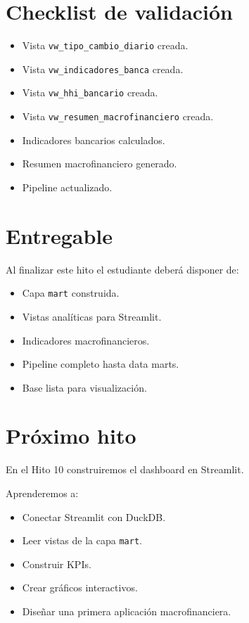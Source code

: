\section{Checklist de validación}

\begin{itemize}
\item[$\Box$] Vista \texttt{vw_tipo_cambio_diario} creada.
\item[$\Box$] Vista \texttt{vw_indicadores_banca} creada.
\item[$\Box$] Vista \texttt{vw_hhi_bancario} creada.
\item[$\Box$] Vista \texttt{vw_resumen_macrofinanciero} creada.
\item[$\Box$] Indicadores bancarios calculados.
\item[$\Box$] Resumen macrofinanciero generado.
\item[$\Box$] Pipeline actualizado.
\end{itemize}

\section{Entregable}

Al finalizar este hito el estudiante deberá disponer de:

\begin{itemize}
\item Capa \texttt{mart} construida.
\item Vistas analíticas para Streamlit.
\item Indicadores macrofinancieros.
\item Pipeline completo hasta data marts.
\item Base lista para visualización.
\end{itemize}

\section{Próximo hito}

En el Hito 10 construiremos el dashboard en Streamlit.

Aprenderemos a:

\begin{itemize}
\item Conectar Streamlit con DuckDB.
\item Leer vistas de la capa \texttt{mart}.
\item Construir KPIs.
\item Crear gráficos interactivos.
\item Diseñar una primera aplicación macrofinanciera.
\end{itemize}
